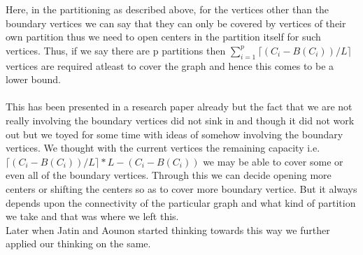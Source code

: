 \documentclass[12pt,a4paper,onecolumn]{article}
\begin{document}
Here, in the partitioning as described above, for the vertices other than the boundary vertices we can say that they can only be covered by vertices of their own partition thus we need to open centers in the partition itself for such vertices. Thus, if we say there are p partitions then $\sum_{i=1}^{p}\lceil (C_i-B(C_i))/L\rceil$ vertices are required atleast to cover the graph and hence this comes to be a lower bound. \\\\This has been presented in a research paper already but the fact that we are not really involving the boundary vertices did not sink in and though it did not work out but we toyed for some time with ideas of somehow involving the boundary vertices. We thought with the current vertices the remaining capacity i.e. $\lceil (C_i-B(C_i))/L\rceil*L-(C_i-B(C_i))$ we may be able to cover some or even all of the boundary vertices. Through this we can decide opening more centers or shifting the centers so as to cover more boundary vertice. But it always depends upon the connectivity of the particular graph and what kind of partition we take and that was where we left this.\\ Later when Jatin and Aounon started thinking towards this way we further applied our thinking on the same. 
\end{document}

